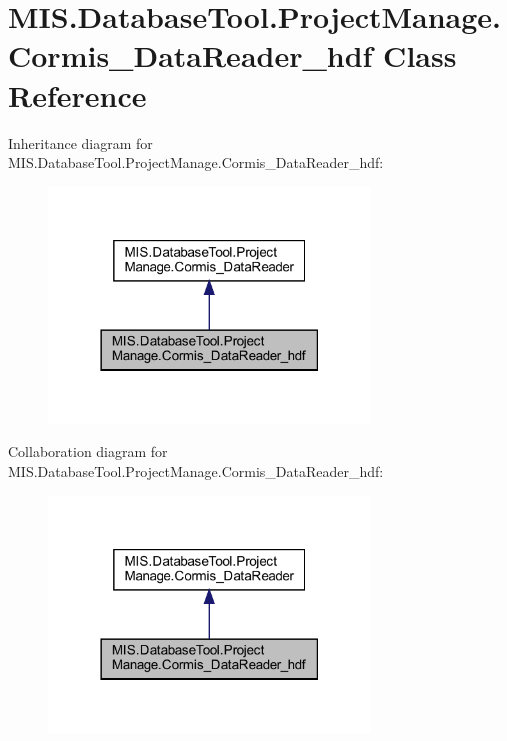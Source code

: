\hypertarget{classMIS_1_1DatabaseTool_1_1ProjectManage_1_1Cormis__DataReader__hdf}{}\section{M\+I\+S.\+Database\+Tool.\+Project\+Manage.\+Cormis\+\_\+\+Data\+Reader\+\_\+hdf Class Reference}
\label{classMIS_1_1DatabaseTool_1_1ProjectManage_1_1Cormis__DataReader__hdf}


Inheritance diagram for M\+I\+S.\+Database\+Tool.\+Project\+Manage.\+Cormis\+\_\+\+Data\+Reader\+\_\+hdf\+:\nopagebreak
\begin{figure}[H]
\begin{center}
\leavevmode
\includegraphics[width=242pt]{classMIS_1_1DatabaseTool_1_1ProjectManage_1_1Cormis__DataReader__hdf__inherit__graph}
\end{center}
\end{figure}


Collaboration diagram for M\+I\+S.\+Database\+Tool.\+Project\+Manage.\+Cormis\+\_\+\+Data\+Reader\+\_\+hdf\+:\nopagebreak
\begin{figure}[H]
\begin{center}
\leavevmode
\includegraphics[width=242pt]{classMIS_1_1DatabaseTool_1_1ProjectManage_1_1Cormis__DataReader__hdf__coll__graph}
\end{center}
\end{figure}
